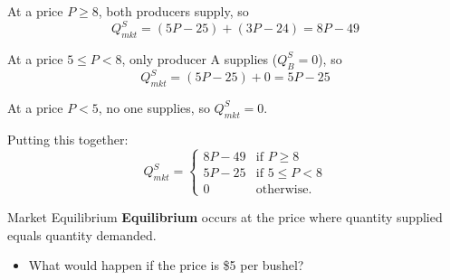 \documentclass[12pt,t]{beamer}
\begin{document}
\begin{frame}[shrink]

  \bigskip
  At a price $P \geq 8$, both producers supply, so
  $$Q_{mkt}^S = (5P - 25) + (3P - 24) = 8P - 49$$

  \medskip
  At a price $5 \leq P < 8$, only producer A supplies ($Q_B^S = 0$), so
  $$Q_{mkt}^S = (5P - 25) + 0 = 5P - 25$$

  \medskip
  At a price $P < 5$, no one supplies, so $Q_{mkt}^S = 0$.

  \bigskip
  Putting this together:
  $$
    Q_{mkt}^S =
    \begin{cases}
      8P - 49 & \text{if } P \geq 8     \\
      5P - 25 & \text{if } 5 \leq P < 8 \\
      0       & \text{otherwise}.
    \end{cases}
  $$
\end{frame}

\begin{frame}{Market Equilibrium}
  \textbf{Equilibrium} occurs at the price where quantity supplied equals quantity demanded. 

  \begin{itemize}
    \item What would happen if the price is \$5 per bushel?
  \end{itemize}
\end{frame}
\end{document}
